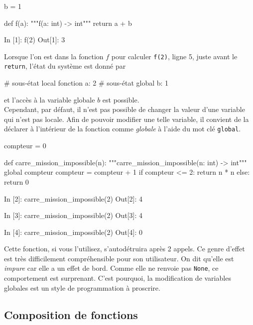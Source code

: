 \documentclass{magnoliaold}
\begin{document}
\begin{pythoncodeline}
b = 1

def f(a):
    """f(a: int) -> int"""
    return a + b
\end{pythoncodeline}

\begin{pythoncode}
In [1]: f(2)
Out[1]: 3  
\end{pythoncode}

\noindent Lorsque l'on est dans la fonction $f$
pour calculer \verb_f(2)_, ligne 5, juste avant le \verb_return_, l'état du système est donné par
\begin{pythoncode}
# sous-état local fonction  {a: 2}
# sous-état global                 {b: 1}
\end{pythoncode}
\noindent et l'accès à la variable globale $b$ est possible.\\

Cependant, par défaut, il n'est pas possible de changer la valeur d'une variable
qui n'est pas locale. Afin de pouvoir modifier une telle variable, il convient de la
déclarer à l'intérieur de la fonction comme \emph{globale} à l'aide du mot clé
\verb_global_.

\begin{pythoncodeline}
compteur = 0

def carre_mission_impossible(n):
    """carre_mission_impossible(n: int) -> int"""
    global compteur
    compteur = compteur + 1
    if compteur <= 2:
        return n * n
    else:
        return 0
\end{pythoncodeline}

\begin{pythoncode}
In [2]: carre_mission_impossible(2)
Out[2]: 4

In [3]: carre_mission_impossible(2)
Out[3]: 4

In [4]: carre_mission_impossible(2)
Out[4]: 0
\end{pythoncode}

\noindent Cette fonction, si vous l'utilisez, s'autodétruira après 2 appels.
Ce genre d'effet est très
difficilement compréhensible pour son utilisateur. On dit qu'elle est \emph{impure} car elle a un effet de bord. Comme elle ne renvoie pas
\verb!None!, ce comportement est surprenant.
C'est pourquoi, la modification de variables globales est un style de programmation à
proscrire.


\subsection{Composition de fonctions}
\end{document}
